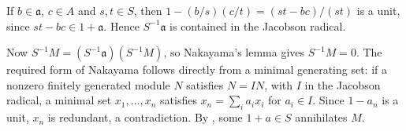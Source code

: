 If $b\in\mathfrak a$, $c\in A$ and $s,t\in S$, then $1-(b/s)(c/t)=(st-bc)/(st)$ is a unit, since $st-bc\in1+\mathfrak a$. Hence $S^{-1}\mathfrak a$ is contained in the Jacobson radical.

Now $S^{-1}M=(S^{-1}\mathfrak a)(S^{-1}M)$, so Nakayama's lemma gives $S^{-1}M=0$. The required form of Nakayama follows directly from a minimal generating set: if a nonzero finitely generated module $N$ satisfies $N=IN$, with $I$ in the Jacobson radical, a minimal set $x_1,\ldots,x_n$ satisfies $x_n=\sum_i a_ix_i$ for $a_i\in I$. Since $1-a_n$ is a unit, $x_n$ is redundant, a contradiction. By , some $1+a\in S$ annihilates $M$.
